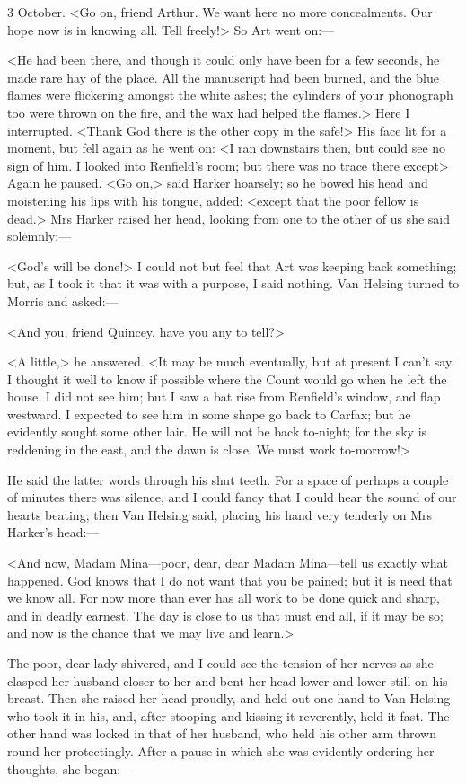\begin{diary}{3 October.}
<Go on, friend Arthur. We want here no more concealments. Our hope now is in knowing all. Tell freely!> So Art went on:—

<He had been there, and though it could only have been for a few seconds, he made rare hay of the place. All the manuscript had been burned, and the blue flames were flickering amongst the white ashes; the cylinders of your phonograph too were thrown on the fire, and the wax had helped the flames.> Here I interrupted. <Thank God there is the other copy in the safe!> His face lit for a moment, but fell again as he went on: <I ran downstairs then, but could see no sign of him. I looked into Renfield's room; but there was no trace there except\longdash> Again he paused. <Go on,> said Harker hoarsely; so he bowed his head and moistening his lips with his tongue, added: <except that the poor fellow is dead.> Mrs Harker raised her head, looking from one to the other of us she said solemnly:—

<God's will be done!> I could not but feel that Art was keeping back something; but, as I took it that it was with a purpose, I said nothing. Van Helsing turned to Morris and asked:—

<And you, friend Quincey, have you any to tell?>

<A little,> he answered. <It may be much eventually, but at present I can't say. I thought it well to know if possible where the Count would go when he left the house. I did not see him; but I saw a bat rise from Renfield's window, and flap westward. I expected to see him in some shape go back to Carfax; but he evidently sought some other lair. He will not be back to-night; for the sky is reddening in the east, and the dawn is close. We must work to-morrow!>

He said the latter words through his shut teeth. For a space of perhaps a couple of minutes there was silence, and I could fancy that I could hear the sound of our hearts beating; then Van Helsing said, placing his hand very tenderly on Mrs Harker's head:—

<And now, Madam Mina—poor, dear, dear Madam Mina—tell us exactly what happened. God knows that I do not want that you be pained; but it is need that we know all. For now more than ever has all work to be done quick and sharp, and in deadly earnest. The day is close to us that must end all, if it may be so; and now is the chance that we may live and learn.>

The poor, dear lady shivered, and I could see the tension of her nerves as she clasped her husband closer to her and bent her head lower and lower still on his breast. Then she raised her head proudly, and held out one hand to Van Helsing who took it in his, and, after stooping and kissing it reverently, held it fast. The other hand was locked in that of her husband, who held his other arm thrown round her protectingly. After a pause in which she was evidently ordering her thoughts, she began:—


\end{diary}
